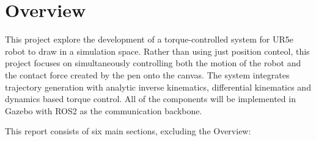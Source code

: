 \section{Overview}

\normalsize
This project explore the development of a torque-controlled system for UR5e robot to draw in a simulation space. Rather than using just position conteol, this project focuses on simultaneously controlling both the motion of the robot and the contact force created by the pen onto the canvas. The system integrates trajectory generation with analytic inverse kinematics, differential kinematics and dynamics based torque control. All of the components will be implemented in Gazebo with ROS2 as the communication backbone.\vspace{0.5cm}

This report consists of six main sections, excluding the Overview:

